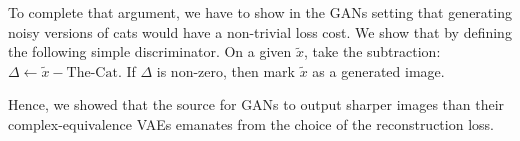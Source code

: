 \documentclass{article}
\begin{document}
To complete that argument, we have to show in the GANs setting that generating noisy versions of cats would have a non-trivial loss cost. We show that by defining the following simple discriminator. On a given $\tilde{x}$, take the subtraction: $\Delta \leftarrow \tilde{x} - \text{The-Cat}$. If $\Delta$ is non-zero, then mark $\tilde{x}$ as a generated image.

Hence, we showed that the source for GANs to output sharper images than their complex-equivalence VAEs emanates from the choice of the reconstruction loss.


\end{document}
